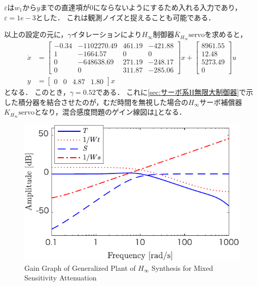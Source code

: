$\varepsilon$は$w_1$から$y$までの直達項が0にならないようにするため入れる入力であり，$\varepsilon = 1e-3$とした．
これは観測ノイズと捉えることも可能である．

以上の設定の元に，$\gamma$イタレーションにより$H_\infty$制御器$\bar{K}_{H_\infty}\mathrm{servo}$を求めると，
\begin{align}
    \dot{x} & =
    \begin{bmatrix}
        -0.34&-1102270.49&461.19&-421.88\\
        1&-1664.57&0&0\\
        0&-648638.69&271.19&-248.17\\
        0&0&311.87&-285.06
    \end{bmatrix}
    x+
    \begin{bmatrix}
        8961.55\\12.48\\5273.49\\0
    \end{bmatrix}
    u           \\
    y       & =
    \begin{bmatrix}
        0&0&4.87&1.80
    \end{bmatrix}
    x
\end{align}
となる．
このとき，$\gamma = 0.52$である．
これに\ref{sec:サーボ系H無限大制御器}で示した積分器を結合させたのが，むだ時間を無視した場合の$H_\infty$サーボ補償器$K_{H_\infty}\mathrm{servo}$となり，混合感度問題のゲイン線図は\figname\ref{fig:HinftyController-crop}となる．
\begin{figure}[t]
    \centering
        \includegraphics[keepaspectratio, scale=1.0]{contents/Appendix_Hinfty/figure/HinftyController-crop.pdf}
        \caption{Gain Graph of Generalized Plant of $H_\infty$ Synthesis for Mixed Sensitivity Attenuation}
        \label{fig:HinftyController-crop}
\end{figure}

